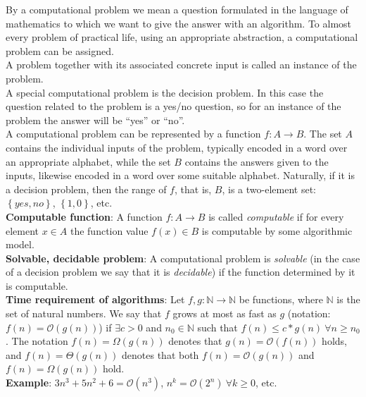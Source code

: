 \documentclass[margin=0px]{article}
\begin{document}
By a computational problem we mean a question formulated in the language of mathematics
to which we want to give the answer with an algorithm. To almost every problem of
practical life, using an appropriate abstraction, a computational problem can be assigned.\\

\noindent A problem together with its associated concrete input is called an instance of the
problem.\\

A special computational problem is the decision problem. In this case the question related to the problem
is a yes/no question, so for an instance of the problem the answer will be ``yes'' or ``no''.\\

A computational problem can be represented by a function $f : A \to B$. The set $A$
contains the individual inputs of the problem, typically encoded in a word over an appropriate alphabet,
while the set $B$ contains the answers given to the inputs, likewise encoded in a word over some suitable alphabet. Naturally,
if it is a decision problem, then the range of $f$, that is, $B$,
is a two-element set: $\left\{yes, no\right\}$, $\left\{1, 0\right\}$, etc.\\

\noindent \textbf{Computable function}: A function $f : A \to B$ is called \textit{computable}
if for every element $x \in A$ the function value $f(x) \in B$ is computable by some
algorithmic model.\\

\noindent \textbf{Solvable, decidable problem}: A computational problem is \textit{solvable}
(in the case of a decision problem we say that it is \textit{decidable}) if the function determined by it
is computable.\\

\noindent \textbf{Time requirement of algorithms}: Let $f,g: \mathbb{N} \to \mathbb{N}$ be functions, where
$\mathbb{N}$ is the set of natural numbers. We say that $f$ grows at most as fast as $g$
(notation: $f(n) = \mathcal{O}(g(n))$) if $\exists c>0$ and $n_{0} \in \mathbb{N}$ such that
$f(n) \leq c * g(n) \ \forall n \geq n_{0}$. The notation $f(n) = \Omega(g(n))$ denotes that $g(n) = \mathcal{O}(f(n))$
holds, and $f(n) = \Theta(g(n))$ denotes that both $f(n) = \mathcal{O}(g(n))$ and $f(n) = \Omega(g(n))$ hold.\\

\noindent \textbf{Example}: $3n^{3} + 5n^{2} + 6 = \mathcal{O}(n^{3})$, $n^{k} = \mathcal{O}(2^{n}) \ \forall k \geq 0$, etc.\\
\end{document}

